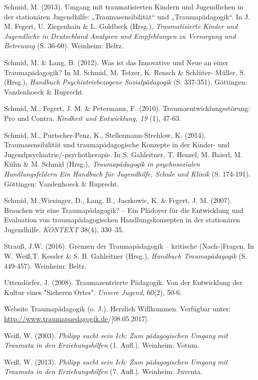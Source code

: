 \hang
Schmid, M. (2013). Umgang mit traumatisierten Kindern und Jugendlichen in der station{\"a}ren Jugendhilfe: „Traumasensibilit{\"a}t“ und „Traumap{\"a}dagogik“. In J. M. Fegert, U. Ziegenhain \& L. Goldbeck (Hrsg.), \textit{Traumatisierte Kinder und Jugendliche in Deutschland Analysen und Empfehlungen zu Versorgung und Betreuung} (S. 36-60). Weinheim: Beltz.

\hang
Schmid, M. \& Lang, B. (2012). Was ist das Innovative und Neue an einer Traumap{\"a}dagogik? In M. Schmid, M. Tetzer, K. Rensch \& Schlüter- Müller, S. (Hrsg.), \textit{Handbuch Psychiatriebezogene Sozialpädagogik} (S. 337-351). Göttingen: Vandenhoeck \& Ruprecht.

\hang
Schmid, M., Fegert, J. M. \& Petermann, F. (2010). Traumaentwicklungsstörung: Pro und Contra. \textit{Kindheit und Entwicklung, 19} (1), 47-63.

\hang
Schmid, M., Purtscher-Penz, K., Stellermann-Strehlow, K. (2014). Traumasensibilit{\"a}t und traumap{\"a}dagogische Konzepte in der Kinder- und Jugendpsychiatrie/-psychotherapie. In S. Gahleitner, T. Hensel, M. Baierl, M. K{\"u}hn \& M. Schmid (Hrsg.), \textit{Traumap{\"a}dagogik in psychosozialen Handlungsfeldern Ein Handbuch f{\"u}r Jugendhilfe, Schule und Klinik} (S. 174-191). Göttingen: Vandenhoeck \& Ruprecht.

\hang
Schmid, M.,Wiesinger, D., Lang, B., Jaszkowic, K. \& Fegert, J. M. (2007). Brauchen wir eine Traumap{\"a}dagogik? – Ein Pl{\"a}doyer f{\"u}r die Entwicklung und Evaluation von traumap{\"a}dagogischen Handlungskonzepten in der station{\"a}ren Jugendhilfe. \textit{KONTEXT} 38(4), 330–35.

\hang
Strauß, J.W. (2016). Grenzen der Traumap{\"a}dagogik – kritische (Nach-)Fragen. In W. Weiß,T. Kessler \& S. B. Gahleitner (Hrsg.), \textit{Handbuch Traumapädagogik} (S. 449-457). Weinheim: Beltz.

\hang
Uttendörfer, J. (2008). Traumazentrierte Pädagogik. Von der Entwicklung der Kultur eines "Sicheren Ortes". \textit{Unsere Jugend}, 60(2), 50-6.

\hang
Website Traumapädagogik (o. J.). Herzlich Willkommen. Verfügbar unter: \url{http://www.traumapaedagogik.de}/[08.05.2017].

\hang
Weiß, W. (2003). \textit{Philipp sucht sein Ich: Zum pädagogischen Umgang mit Traumata in den Erziehungshilfen} (1. Aufl.). Weinheim: Votum.

\hang
Weiß, W. (2013). \textit{Philipp sucht sein Ich: Zum pädagogischen Umgang mit Traumata in den Erziehungshilfen} (7. Aufl.). Weinheim: Juventa.

